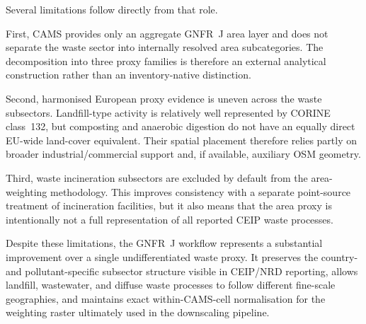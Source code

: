 Several limitations follow directly from that role.

First, CAMS provides only an aggregate GNFR~J area layer and does not
separate the waste sector into internally resolved area subcategories.
The decomposition into three proxy families is therefore an external
analytical construction rather than an inventory-native distinction.

Second, harmonised European proxy evidence is uneven across the waste
subsectors. Landfill-type activity is relatively well represented by
CORINE class~132, but composting and anaerobic digestion do not have an
equally direct EU-wide land-cover equivalent. Their spatial placement
therefore relies partly on broader industrial/commercial support and, if
available, auxiliary OSM geometry.

Third, waste incineration subsectors are excluded by default from the
area-weighting methodology. This improves consistency with a separate
point-source treatment of incineration facilities, but it also means
that the area proxy is intentionally not a full representation of all
reported CEIP waste processes.

Despite these limitations, the GNFR~J workflow represents a substantial
improvement over a single undifferentiated waste proxy. It preserves the
country- and pollutant-specific subsector structure visible in CEIP/NRD
reporting, allows landfill, wastewater, and diffuse waste processes to
follow different fine-scale geographies, and maintains exact
within-CAMS-cell normalisation for the weighting raster ultimately used
in the downscaling pipeline.

